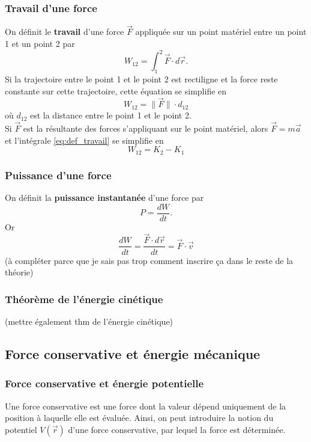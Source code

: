 \documentclass{article}
\providecommand{\norm}[1]{{\lVert#1\rVert}}
\begin{document}
\subsubsection{Travail d'une force}
On définit le \textbf{travail} d'une force $\vec F$ appliquée sur un point matériel entre un point 1 et un point 2 par
\begin{equation} \label{eq:def_travail}
	W_{12} = \int_1^2 \vec F \cdot d \vec r.
\end{equation}
Si la trajectoire entre le point 1 et le point 2 est rectiligne et la force reste constante sur cette trajectoire, cette équation se simplifie en
\begin{equation}
	\boxed{W_{12} = \norm{\vec F} \cdot d_{12}}
\end{equation}
où $d_{12}$ est la distance entre le point 1 et le point 2.\\
Si $\vec F$ est la résultante des forces s'appliquant sur le point matériel, alors $\vec F = m \vec a$ et l'intégrale \eqref{eq:def_travail} se simplifie en
\begin{equation} \label{eq:travail-K}
	W_{12} = K_2 - K_1
\end{equation}

\subsubsection{Puissance d'une force}
On définit la \textbf{puissance instantanée} d'une force par
\begin{equation}
	P = \frac{dW}{dt}.
\end{equation}
Or
\begin{equation}
	\frac{dW}{dt} = \frac{\vec F \cdot d \vec r}{dt} = \vec F \cdot \vec v
\end{equation}
(à compléter parce que je sais pas trop comment inscrire ça dans le reste de la théorie)\\

\subsubsection{Théorème de l'énergie cinétique}
(mettre également thm de l'énergie cinétique)

\subsection{Force conservative et énergie mécanique}
\subsubsection{Force conservative et énergie potentielle}
Une force conservative est une force dont la valeur dépend uniquement de la position à laquelle elle est évaluée. Ainsi, on peut introduire la notion du potentiel $V(\vec r)$ d'une force conservative, par lequel la force est déterminée.
\end{document}
